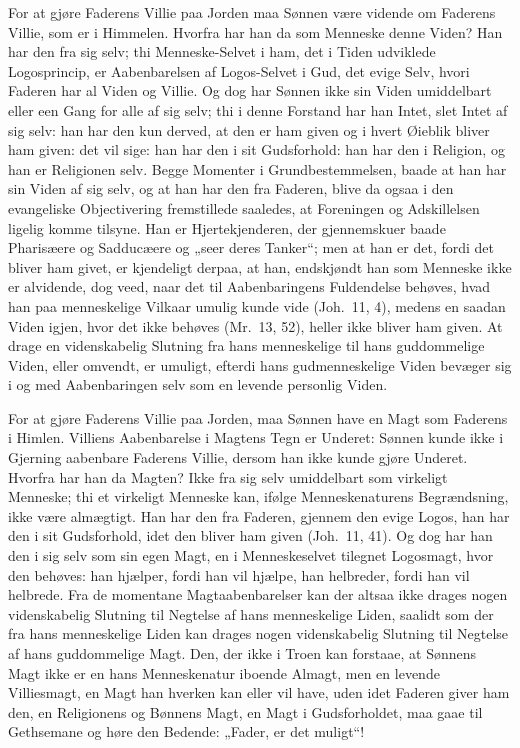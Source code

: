 \documentclass[12pt]{book}
\begin{document}
For at gjøre Faderens Villie paa Jorden maa Sønnen være vidende om
Faderens Villie, som er i Himmelen. Hvorfra har han da som Menneske
denne Viden? Han har den fra sig selv; thi Menneske-Selvet i ham,
det i
Tiden udviklede Logosprincip, er Aabenbarelsen af Logos-Selvet i
Gud, det evige Selv, hvori Faderen har al Viden og Villie. Og dog
har Sønnen ikke sin Viden umiddelbart eller een Gang for alle af sig
selv; thi i denne Forstand har han Intet, slet Intet af sig selv:
han har den kun derved, at den er ham given og i hvert Øieblik
bliver ham given: det vil sige: han har den i sit Gudsforhold: han
har den i Religion, og han er Religionen selv. Begge Momenter i
Grundbestemmelsen, baade at han har sin Viden af sig selv, og at han
har den fra Faderen, blive da ogsaa i den evangeliske Objectivering
fremstillede saaledes, at Foreningen og Adskillelsen ligelig komme
tilsyne. Han er Hjertekjenderen, der gjennemskuer baade Pharisæere
og Sadducæere og „seer deres Tanker“; men at han er det, fordi det
bliver ham givet, er kjendeligt derpaa, at han, endskjøndt han som
Menneske ikke er alvidende, dog veed, naar det til Aabenbaringens
Fuldendelse behøves, hvad han paa menneskelige Vilkaar umulig kunde
vide (Joh.\ 11, 4), medens en saadan Viden igjen, hvor det ikke
behøves (Mr.\ 13, 52), heller ikke bliver ham given.
At drage en videnskabelig Slutning fra hans menneskelige til hans
guddommelige Viden, eller omvendt, er umuligt, efterdi hans
gudmenneskelige Viden bevæger sig i og med Aabenbaringen selv som en
levende personlig Viden.

For at gjøre Faderens Villie paa Jorden, maa Sønnen have en Magt som
Faderens i Himlen. Villiens Aabenbarelse i Magtens Tegn er Underet:
Sønnen kunde ikke i Gjerning aabenbare Faderens Villie, dersom han
ikke kunde gjøre Underet. Hvorfra har han da Magten? Ikke fra sig
selv umiddelbart som virkeligt Menneske; thi et virkeligt Menneske
kan, ifølge Menneskenaturens Begrændsning, ikke være almægtigt. Han
har den fra Faderen, gjennem den evige Logos, han har den i sit
Gudsforhold, idet den bliver ham given (Joh.\ 11, 41). Og dog har
han
den i sig selv som sin egen Magt, en i Menneskeselvet tilegnet
Logosmagt, hvor den behøves: han hjælper, fordi han vil hjælpe, han
helbreder, fordi han vil helbrede. Fra de momentane
Magtaabenbarelser kan der altsaa ikke drages nogen videnskabelig
Slutning til Negtelse af hans menneskelige Liden, saalidt som der
fra hans menneskelige Liden kan drages nogen videnskabelig Slutning
til Negtelse af hans guddommelige Magt. Den, der ikke i Troen kan
forstaae, at Sønnens Magt ikke er en hans Menneskenatur iboende
Almagt, men en levende Villiesmagt, en Magt han hverken kan eller
vil have, uden idet Faderen giver ham den, en Religionens og
Bønnens Magt, en Magt i Gudsforholdet, maa gaae til Gethsemane og
høre den Bedende: „Fader, er det muligt“!
\end{document}
